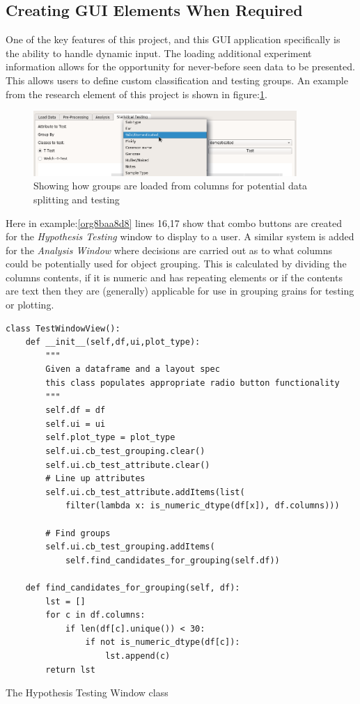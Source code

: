 \documentclass[11pt]{report}
\begin{document}
\subsection{Creating GUI Elements When Required}
\label{sec:org20d38ff}

One of the key features of this project, and this GUI application specifically is the ability to handle dynamic input. The loading additional experiment information allows for the opportunity for never-before seen data to be presented. This allows users to define custom classification and testing groups. An example from the research element of this project is shown in figure:\ref{fig:org8b989d2}.

\begin{figure}[htbp]
\centering
\includegraphics[width=10cm]{./images/dynamicselection.png}
\caption{\label{fig:org8b989d2}
Showing how groups are loaded from columns for potential data splitting and testing}
\end{figure}

Here in example:\ref{org8baa8d8} lines 16,17 show that combo buttons are created for the \emph{Hypothesis Testing} window to display to a user. A similar system is added for the \emph{Analysis Window} where decisions are carried out as to what columns could be potentially used for object grouping. This is calculated by dividing the columns contents, if it is numeric and has repeating elements or if the contents are text then they are (generally) applicable for use in grouping grains for testing or plotting.

\begin{listing}[htbp]
\begin{verbatim}
class TestWindowView():
    def __init__(self,df,ui,plot_type):
        """
        Given a dataframe and a layout spec
        this class populates appropriate radio button functionality
        """
        self.df = df
        self.ui = ui
        self.plot_type = plot_type
        self.ui.cb_test_grouping.clear()
        self.ui.cb_test_attribute.clear()
        # Line up attributes
        self.ui.cb_test_attribute.addItems(list(
            filter(lambda x: is_numeric_dtype(df[x]), df.columns)))

        # Find groups
        self.ui.cb_test_grouping.addItems(
            self.find_candidates_for_grouping(self.df))

    def find_candidates_for_grouping(self, df):
        lst = []
        for c in df.columns:
            if len(df[c].unique()) < 30:
                if not is_numeric_dtype(df[c]):
                    lst.append(c)
        return lst
\end{verbatim}
\caption{\label{org8baa8d8}
The Hypothesis Testing Window class}
\end{listing}
\end{document}
